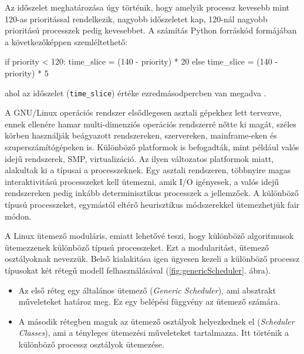 Az időszelet meghatározása úgy történik, hogy amelyik processz kevesebb mint 120-as prioritással rendelkezik, nagyobb időszeletet kap, 120-nál nagyobb prioritású processzek pedig kevesebbet. A számítás Python forráskód formájában a következőképpen szemléltethető:
\begin{python}
if priority < 120:
    time_slice = (140 - priority) * 20
else
    time_slice = (140 - priority) * 5
\end{python}
ahol az időszelet (\texttt{time\_slice}) értéke ezredmásodpercben van megadva \cite{rebeiro2020scheduling, wong2008fairness}.



A GNU/Linux operációs rendszer elsődlegesen asztali gépekhez lett tervezve, ennek ellenére hamar multi-dimenziós operációs rendszerré nőtte ki magát, széles körben használják beágyazott rendszereken, szervereken, mainframe-eken és szuperszámítógépeken is. Különböző platformok is befogadták, mint például valós idejű rendszerek, SMP, virtualizáció. Az ilyen változatos platformok miatt, alakultak ki a típusai a processzeknek. Egy asztali rendszeren, többnyire magas interaktivitású processzeket kell ütemezni, amik I/O igényesek, a valós idejű rendszereken pedig inkább  determinisztikus processzek a jellemzőek. A különböző típusú processzeket, egymástól eltérő heurisztikus módszerekkel ütemezhetjük fair módon.


A Linux ütemező moduláris, emiatt lehetővé teszi, hogy különböző algoritmusok ütemezzenek különböző típusú processzeket. Ezt a modularitást, ütemező osztályoknak nevezzük. Belső kialakitása igen ügyesen kezeli a különböző processz típusokat két rétegű modell felhasználásával (\ref{fig:genericScheduler}. ábra).
\begin{itemize}
\item Az első réteg egy általános ütemező (\textit{Generic Scheduler}), ami absztrakt műveleteket határoz meg. Ez egy belépési függvény az ütemező számára.
\item A második rétegben maguk az ütemező osztályok helyezkednek el (\textit{Scheduler Classes}), ami a tényleges ütemezési műveleteket tartalmazza. Itt történik a különböző  processz osztályok ütemezése.
\end{itemize} 

